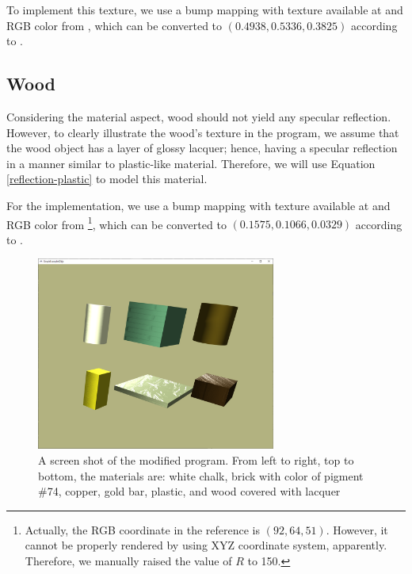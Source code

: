 To implement this texture, we use a bump mapping with texture available at \cite{texture-plastic} and RGB color from \cite{color-plastic}, which can be converted to $(0.4938,0.5336,0.3825)$ according to \cite{color-converter}.

\subsection{Wood}

Considering the material aspect, wood should not yield any specular reflection. However, to clearly illustrate the wood's texture in the program, we assume that the wood object has a layer of glossy lacquer; hence, having a specular reflection in a manner similar to plastic-like material. Therefore, we will use Equation \eqref{reflection-plastic} to model this material.

For the implementation, we use a bump mapping with texture available at \cite{texture-wood} and RGB color from \cite{color-wood} \footnote{Actually, the RGB coordinate in the reference is $(92,64,51)$. However, it cannot be properly rendered by using XYZ coordinate system, apparently. Therefore, we manually raised the value of $R$ to 150.}, which can be converted to $(0.1575,0.1066,0.0329)$ according to \cite{color-converter}.


\begin{figure}[h]
    \centering
    \includegraphics[width=0.7\textwidth]{figures/assignment7/assignment7-snapshot.png}
    \caption{A screen shot of the modified program. From left to right, top to bottom, the materials are: white chalk, brick with color of pigment \#74, copper, gold bar, plastic, and wood covered with lacquer}
    \label{assignment7-snapshot}
\end{figure}

